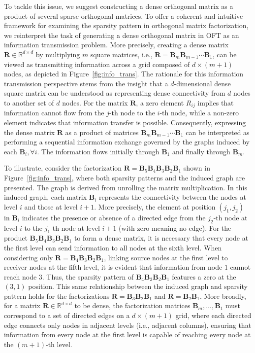 To tackle this issue, we suggest constructing a dense orthogonal matrix as a product of several sparse orthogonal matrices. To offer a coherent and intuitive framework for examining the sparsity pattern in orthogonal matrix factorization, we reinterpret the task of generating a dense orthogonal matrix in OFT as an information transmission problem. More precisely, creating a dense matrix $\bm{R}\in\mathbb{R}^{d\times d}$ by multiplying $m$ square matrices, i.e., $\bm{R}=\bm{B}_m\bm{B}_{m-1}\cdots\bm{B}_1$, can be viewed as transmitting information across a grid composed of $d\times (m+1)$ nodes, as depicted in Figure~\ref{fig:info_trans}. The rationale for this information transmission perspective stems from the insight that a $d$-dimensional dense square matrix can be understood as representing dense connectivity from $d$ nodes to another set of $d$ nodes. For the matrix $\bm{R}$, a zero element $R_{ij}$ implies that information cannot flow from the $j$-th node to the $i$-th node, while a non-zero element indicates that information transfer is possible. Consequently, expressing the dense matrix $\bm{R}$ as a product of matrices $\bm{B}_m\bm{B}_{m-1}\cdots\bm{B}_1$ can be interpreted as performing a sequential information exchange governed by the graphs induced by each $\bm{B}_i, \forall i$. The information flows initially through $\bm{B}_1$ and finally through $\bm{B}_m$. 

To illustrate, consider the factorization $\bm{R}=\bm{B}_5\bm{B}_4\bm{B}_3\bm{B}_2\bm{B}_1$ shown in Figure~\ref{fig:info_trans}, where both sparsity patterns and the induced graph are presented. The graph is derived from unrolling the matrix multiplication. In this induced graph, each matrix $\bm{B}_i$ represents the connectivity between the nodes at level $i$ and those at level $i+1$. More precisely, the element at position $(j_1,j_2)$ in $\bm{B}_i$ indicates the presence or absence of a directed edge from the $j_2$-th node at level $i$ to the $j_1$-th node at level $i+1$ (with zero meaning no edge). For the product $\bm{B}_5\bm{B}_4\bm{B}_3\bm{B}_2\bm{B}_1$ to form a dense matrix, it is necessary that every node at the first level can send information to all nodes at the sixth level. When considering only $\bm{R}=\bm{B}_4\bm{B}_3\bm{B}_2\bm{B}_1$, linking source nodes at the first level to receiver nodes at the fifth level, it is evident that information from node $1$ cannot reach node $3$. Thus, the sparsity pattern of $\bm{B}_4\bm{B}_3\bm{B}_2\bm{B}_1$ features a zero at the $(3,1)$ position. This same relationship between the induced graph and sparsity pattern holds for the factorizations $\bm{R}=\bm{B}_3\bm{B}_2\bm{B}_1$ and $\bm{R}=\bm{B}_2\bm{B}_1$. More broadly, for a matrix $\bm{R}\in\mathbb{R}^{d\times d}$ to be dense, the factorization matrices $\bm{B}_m,\ldots,\bm{B}_1$ must correspond to a set of directed edges on a $d\times (m+1)$ grid, where each directed edge connects only nodes in adjacent levels (i.e., adjacent columns), ensuring that information from every node at the first level is capable of reaching every node at the $(m+1)$-th level.

